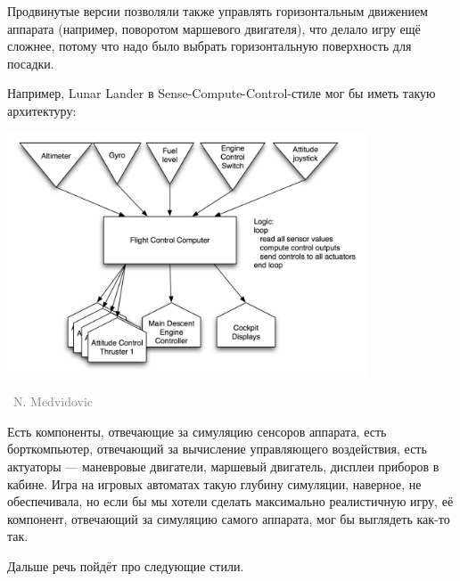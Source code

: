 \documentclass[a5paper]{article}
\newcommand{\attribution}[1] {
    \vspace{-4mm}\begin{flushright}\begin{scriptsize}\textcolor{gray}
    {\textcopyright\, #1}\end{scriptsize}\end{flushright}
}
\begin{document}
Продвинутые версии позволяли также управлять горизонтальным движением аппарата (например, поворотом маршевого двигателя), что делало игру ещё сложнее, потому что надо было выбрать горизонтальную поверхность для посадки.

Например, Lunar Lander в Sense-Compute-Control-стиле мог бы иметь такую архитектуру:

\begin{center}
    \includegraphics[width=0.8\textwidth]{senseComputeControlLunarLander.png}
    \attribution{N. Medvidovic}
\end{center}

Есть компоненты, отвечающие за симуляцию сенсоров аппарата, есть борткомпьютер, отвечающий за вычисление управляющего воздействия, есть актуаторы --- маневровые двигатели, маршевый двигатель, дисплеи приборов в кабине. Игра на игровых автоматах такую глубину симуляции, наверное, не обеспечивала, но если бы мы хотели сделать максимально реалистичную игру, её компонент, отвечающий за симуляцию самого аппарата, мог бы выглядеть как-то так.

Дальше речь пойдёт про следующие стили.
\end{document}
